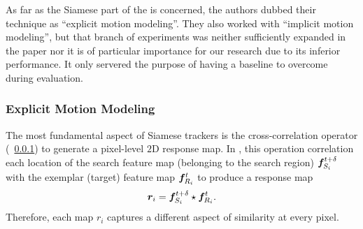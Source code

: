 As far as the Siamese part of the \siammot{} is concerned, the authors dubbed their technique as ``explicit motion modeling''. They also worked with ``implicit motion modeling'', but that branch of experiments was neither sufficiently expanded in the paper nor it is of particular importance for our research due to its inferior performance. It only servered the purpose of having a baseline to overcome during evaluation.

\subsubsection{Explicit Motion Modeling}

The most fundamental aspect of Siamese trackers is the cross-correlation operator (\sectionstr{}~\ref{}) to generate a pixel-level $2$D response map. In \siammot{}, this operation correlation each location of the search feature map (belonging to the search region) $\bm{f}_{S_i}^{t + \delta}$ with the exemplar (target) feature map $\bm{f}_{R_i}^{t}$ to produce a response map
\begin{equation}
    \bm{r}_{i} = \bm{f}_{S_i}^{t + \delta} \star \bm{f}_{R_i}^{t}.
\end{equation}
Therefore, each map $r_i$ captures a different aspect of similarity at every pixel.

